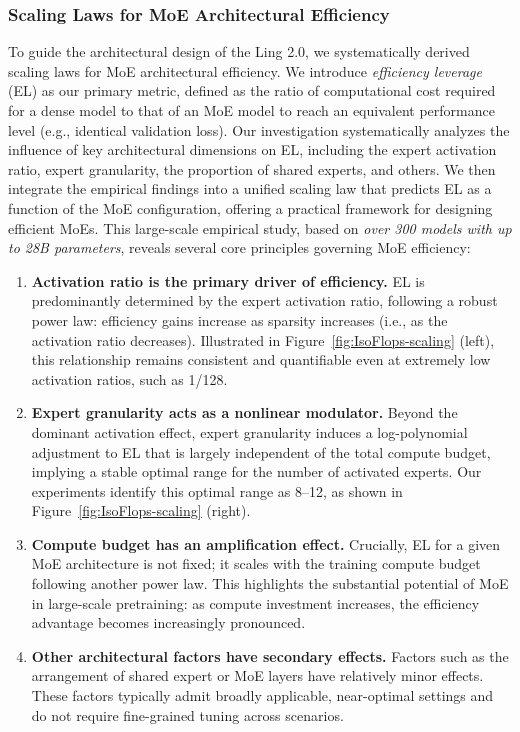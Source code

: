 \subsubsection{Scaling Laws for MoE Architectural Efficiency}
\label{sec:scaling4moe}
To guide the architectural design of the Ling 2.0, we systematically derived scaling laws for MoE architectural efficiency. We introduce \textit{efficiency leverage} (EL) as our primary metric, defined as the ratio of computational cost required for a dense model to that of an MoE model to reach an equivalent performance level (e.g., identical validation loss). Our investigation systematically analyzes the influence of key architectural dimensions on EL, including the expert activation ratio, expert granularity, the proportion of shared experts, and others. We then integrate the empirical findings into a unified scaling law that predicts EL as a function of the MoE configuration, offering a practical framework for designing efficient MoEs. This large-scale empirical study, based on \textit{over 300 models with up to 28B parameters}, reveals several core principles governing MoE efficiency:

\begin{enumerate}
\item \textbf{Activation ratio is the primary driver of efficiency.}
EL is predominantly determined by the expert activation ratio, following a robust power law: efficiency gains increase as sparsity increases (i.e., as the activation ratio decreases). Illustrated in Figure~\ref{fig:IsoFlops-scaling} (left), this relationship remains consistent and quantifiable even at extremely low activation ratios, such as 1/128.

\item \textbf{Expert granularity acts as a nonlinear modulator.}
Beyond the dominant activation effect, expert granularity induces a log-polynomial adjustment to EL that is largely independent of the total compute budget, implying a stable optimal range for the number of activated experts. Our experiments identify this optimal range as 8--12, as shown in Figure~\ref{fig:IsoFlops-scaling} (right).

\item \textbf{Compute budget has an amplification effect.}
Crucially, EL for a given MoE architecture is not fixed; it scales with the training compute budget following another power law. This highlights the substantial potential of MoE in large-scale pretraining: as compute investment increases, the efficiency advantage becomes increasingly pronounced. 

\item \textbf{Other architectural factors have secondary effects.}
Factors such as the arrangement of shared expert or MoE layers have relatively minor effects. These factors typically admit broadly applicable, near-optimal settings and do not require fine-grained tuning across scenarios.

\end{enumerate}


